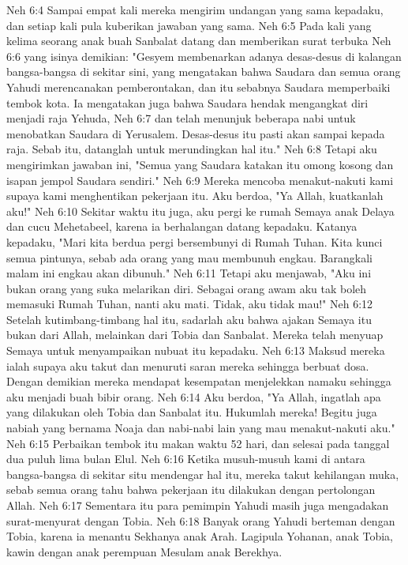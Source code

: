 Neh 6:4  Sampai empat kali mereka mengirim undangan yang sama kepadaku, dan setiap kali pula kuberikan jawaban yang sama.
Neh 6:5  Pada kali yang kelima seorang anak buah Sanbalat datang dan memberikan surat terbuka
Neh 6:6  yang isinya demikian: "Gesyem membenarkan adanya desas-desus di kalangan bangsa-bangsa di sekitar sini, yang mengatakan bahwa Saudara dan semua orang Yahudi merencanakan pemberontakan, dan itu sebabnya Saudara memperbaiki tembok kota. Ia mengatakan juga bahwa Saudara hendak mengangkat diri menjadi raja Yehuda,
Neh 6:7  dan telah menunjuk beberapa nabi untuk menobatkan Saudara di Yerusalem. Desas-desus itu pasti akan sampai kepada raja. Sebab itu, datanglah untuk merundingkan hal itu."
Neh 6:8  Tetapi aku mengirimkan jawaban ini, "Semua yang Saudara katakan itu omong kosong dan isapan jempol Saudara sendiri."
Neh 6:9  Mereka mencoba menakut-nakuti kami supaya kami menghentikan pekerjaan itu. Aku berdoa, "Ya Allah, kuatkanlah aku!"
Neh 6:10  Sekitar waktu itu juga, aku pergi ke rumah Semaya anak Delaya dan cucu Mehetabeel, karena ia berhalangan datang kepadaku. Katanya kepadaku, "Mari kita berdua pergi bersembunyi di Rumah Tuhan. Kita kunci semua pintunya, sebab ada orang yang mau membunuh engkau. Barangkali malam ini engkau akan dibunuh."
Neh 6:11  Tetapi aku menjawab, "Aku ini bukan orang yang suka melarikan diri. Sebagai orang awam aku tak boleh memasuki Rumah Tuhan, nanti aku mati. Tidak, aku tidak mau!"
Neh 6:12  Setelah kutimbang-timbang hal itu, sadarlah aku bahwa ajakan Semaya itu bukan dari Allah, melainkan dari Tobia dan Sanbalat. Mereka telah menyuap Semaya untuk menyampaikan nubuat itu kepadaku.
Neh 6:13  Maksud mereka ialah supaya aku takut dan menuruti saran mereka sehingga berbuat dosa. Dengan demikian mereka mendapat kesempatan menjelekkan namaku sehingga aku menjadi buah bibir orang.
Neh 6:14  Aku berdoa, "Ya Allah, ingatlah apa yang dilakukan oleh Tobia dan Sanbalat itu. Hukumlah mereka! Begitu juga nabiah yang bernama Noaja dan nabi-nabi lain yang mau menakut-nakuti aku."
Neh 6:15  Perbaikan tembok itu makan waktu 52 hari, dan selesai pada tanggal dua puluh lima bulan Elul.
Neh 6:16  Ketika musuh-musuh kami di antara bangsa-bangsa di sekitar situ mendengar hal itu, mereka takut kehilangan muka, sebab semua orang tahu bahwa pekerjaan itu dilakukan dengan pertolongan Allah.
Neh 6:17  Sementara itu para pemimpin Yahudi masih juga mengadakan surat-menyurat dengan Tobia.
Neh 6:18  Banyak orang Yahudi berteman dengan Tobia, karena ia menantu Sekhanya anak Arah. Lagipula Yohanan, anak Tobia, kawin dengan anak perempuan Mesulam anak Berekhya.
